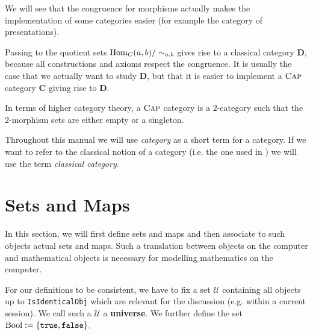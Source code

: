 We will see that the congruence for morphisms actually makes the implementation of some categories easier (for example
the category of presentations).

\begin{remark}
 Passing to the quotient sets $\operatorname{\mathrm{Hom}}_{C}( a, b )/\sim_{a,b}$ gives rise to a classical category $\mathbf{D}$, because
 all constructions and axioms respect the congruence.
 It is usually the case that we actually want to study $\mathbf{D}$, but that it is easier to implement a $\textsc{Cap}$ category $\mathbf{C}$
 giving rise to $\mathbf{D}$.
\end{remark}

\begin{remark}
 In terms of higher category theory, a $\textsc{Cap}$ category is a $2$-category such that the $2$-morphism sets are either empty or a singleton.
\end{remark}

\begin{convention}
 Throughout this manual we will use \textit{category} as a short term for a \CapPkg category. 
 If we want to refer to the classical notion of a category (i.e. the one used in \cite{MLCWM}) we will use the term \textit{classical category}.
\end{convention}

\section{\GAP Sets and \GAP Maps}\label{section:gap_sets}

In this section, we will first define \GAP sets and \GAP maps and
then associate to such objects actual sets and maps. 
Such a translation between objects on the computer and mathematical objects
is necessary for modelling mathematics on the computer.

\begin{remark}
 For our definitions to be consistent, we have to fix
 a set $\mathcal{U}$ containing all \GAP objects up to \texttt{IsIdenticalObj}
 which are relevant for the discussion (e.g. within a current session). 
 We call such a $\mathcal{U}$ a \textbf{\GAP universe}.
 We further define the set $\mathrm{Bool} := \{ \texttt{true}, \texttt{false} \}$.
\end{remark}


